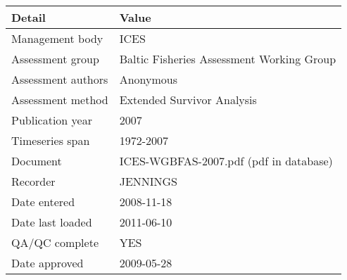 \begin{table}[htb]
\centering
\begin{tabular}{lp{7cm}}
\toprule
Detail & Value \\
\midrule
Management body    & ICES                                      \\
Assessment group   & Baltic Fisheries Assessment Working Group \\
Assessment authors & Anonymous                                 \\
Assessment method  & Extended Survivor Analysis                \\
Publication year   & 2007                                      \\
Timeseries span    & 1972-2007                                 \\
Document           & ICES-WGBFAS-2007.pdf (pdf in database)    \\
Recorder           & JENNINGS                                  \\
Date entered       & 2008-11-18                                \\
Date last loaded   & 2011-06-10                                \\
QA/QC complete     & YES                                       \\
Date approved      & 2009-05-28                                \\
\bottomrule
\end{tabular}
\label{tab:assessdet}
\end{table}
